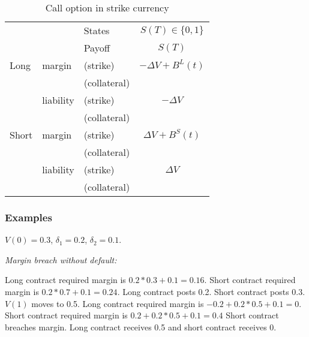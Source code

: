\documentclass[12pt]{article}
\begin{document}
\begin{table}
\centering
\begin{tabular}{lll|c}
\hline
&  & States & $S(T) \in \{0,1\}$ \\
&  & Payoff &  $S(T)$\\
Long      & margin    & (strike)     & $-\Delta V + B^L(t)$  \\
          &           & (collateral) &\\
          & liability & (strike)     & $-\Delta V$\\
          &           & (collateral)&\\
Short     & margin    & (strike)     & $\Delta V + B^S(t)$ \\
          &           & (collateral) &\\
          & liability & (strike)     & $\Delta V$\\
          &           & (collateral) &\\          
\hline
\end{tabular}
\caption{Call option in strike currency}
\label{tab:eventstrike}
\end{table}

\begin{comment}
\begin{itemize}
    \item State: Single state $S(T) \in \{0,1\}$ 
    \item Payoff: $S(T)$
    \item Long margin (strike): $-\Delta V + B^L(t)$
    \item Short margin (strike): $\Delta V + B^S(t)$
    \item Long liability (strike): $\Delta V$
    \item Short liability (strike): $-\Delta V$
\end{itemize}
\end{comment}



\subsubsection*{Examples}

$V(0)=0.3$, $\delta_1=0.2$, $\delta_2=0.1$. 


\textit{Margin breach without default:}


Long contract required margin is $0.2*0.3 +0.1 = 0.16$. Short contract required margin is $0.2*0.7 +0.1 = 0.24$. Long contract posts 0.2. Short contract posts 0.3. $V(1)$ moves to 0.5. Long contract required margin is $-0.2+0.2*0.5 + 0.1 = 0$. Short contract required margin is $0.2+0.2*0.5 + 0.1 = 0.4$
Short contract breaches margin. Long contract receives 0.5 and short contract receives $0$.
\end{document}
